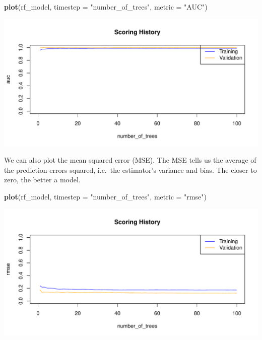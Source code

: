 \documentclass[]{article}
\newenvironment{Shaded}{\begin{snugshade}}{\end{snugshade}}
\newcommand{\KeywordTok}[1]{\textcolor[rgb]{0.13,0.29,0.53}{\textbf{{#1}}}}
\newcommand{\DataTypeTok}[1]{\textcolor[rgb]{0.13,0.29,0.53}{{#1}}}
\newcommand{\StringTok}[1]{\textcolor[rgb]{0.31,0.60,0.02}{{#1}}}
\newcommand{\NormalTok}[1]{{#1}}
\begin{document}
\begin{Shaded}
\begin{Highlighting}[]
\KeywordTok{plot}\NormalTok{(rf_model,}
     \DataTypeTok{timestep =} \StringTok{"number_of_trees"}\NormalTok{,}
     \DataTypeTok{metric =} \StringTok{"AUC"}\NormalTok{)}
\end{Highlighting}
\end{Shaded}

\begin{center}\includegraphics{webinar_code_files/figure-latex/unnamed-chunk-38-1} \end{center}

We can also plot the mean squared error (MSE). The MSE tells us the
average of the prediction errors squared, i.e.~the estimator's variance
and bias. The closer to zero, the better a model.

\begin{Shaded}
\begin{Highlighting}[]
\KeywordTok{plot}\NormalTok{(rf_model,}
     \DataTypeTok{timestep =} \StringTok{"number_of_trees"}\NormalTok{,}
     \DataTypeTok{metric =} \StringTok{"rmse"}\NormalTok{)}
\end{Highlighting}
\end{Shaded}

\begin{center}\includegraphics{webinar_code_files/figure-latex/unnamed-chunk-39-1} \end{center}
\end{document}
